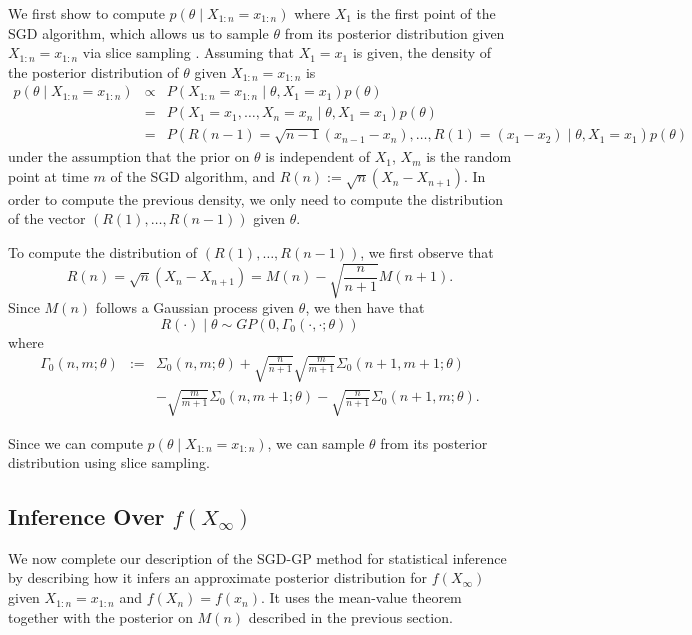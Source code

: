 \documentclass{wscpaperproc}
\theoremstyle{wsc}
\begin{document}
We first show to compute $p\left(\theta\mid X_{1:n} = x_{1:n}\right)$ where $X_{1}$ is the first point of the SGD algorithm, which allows us to sample $\theta$ from its posterior distribution given $X_{1:n} = x_{1:n}$ via slice sampling \cite{radford2003Slice}. Assuming that $X_{1}=x_{1}$ is given, the density of the posterior distribution of $\theta$ given $X_{1:n} = x_{1:n}$ is
\begin{eqnarray*}
p\left(\theta\mid X_{1:n} = x_{1:n}\right) & \propto & P\left(X_{1:n} = x_{1:n}\mid\theta,X_{1}=x_{1}\right)p\left(\theta\right)\\
 & = & P\left(X_{1}=x_{1},\ldots,X_{n}=x_{n}\mid\theta,X_{1}=x_{1}\right)p\left(\theta\right)\\
 & = & P\left(R\left(n-1\right)=\sqrt{n-1}\left(x_{n-1}-x_{n}\right),\ldots,R\left(1\right)=\left(x_{1}-x_{2}\right)\mid\theta,X_{1}=x_{1}\right)p\left(\theta\right)
\end{eqnarray*}
under the assumption that the prior on $\theta$ is independent of $X_{1}$, $X_{m}$ is the random point at time $m$ of the SGD algorithm, and $R(n):= \sqrt{n}\left(X_{n}-X_{n+1}\right)$. In order to compute the previous density, we only need to compute the distribution of the vector $(R(1),\ldots,R(n-1))$ given $\theta$. 

To compute the distribution of $(R(1),\ldots,R(n-1))$, we first observe that 
\[
R(n) = \sqrt{n}\left(X_{n}-X_{n+1}\right) = M\left(n\right)-\sqrt{\frac{n}{n+1}}M\left(n+1\right).
\]
Since $M(n)$ follows a Gaussian process given $\theta$, we then have that
\[
R(\cdot)\mid\theta\sim GP\left(0,\Gamma_{0}\left(\cdot,\cdot;\theta\right)\right)
\]
where 
\begin{eqnarray*}
\Gamma_{0}\left(n,m;\theta\right) & := & \Sigma_{0}\left(n,m;\theta\right)+\sqrt{\frac{n}{n+1}}\sqrt{\frac{m}{m+1}}\Sigma_{0}\left(n+1,m+1;\theta\right)\\
 &  & -\sqrt{\frac{m}{m+1}}\Sigma_{0}\left(n,m+1;\theta\right)-\sqrt{\frac{n}{n+1}}\Sigma_{0}\left(n+1,m;\theta\right).
\end{eqnarray*}

Since we can compute $p\left(\theta\mid X_{1:n} = x_{1:n}\right)$, we can sample $\theta$ from its posterior distribution using slice sampling. 

\subsection{Inference Over $f(X_\infty)$}
\label{sec:SGD-GP-2}
We now complete our description of the SGD-GP method for statistical inference by describing how 
it infers an approximate posterior distribution for $f\left(X_{\infty}\right)$ given $X_{1:n} = x_{1:n}$ and $f(X_n)=f(x_n)$.  It uses the mean-value theorem together with the posterior on $M(n)$ described in the previous section.
\end{document}

